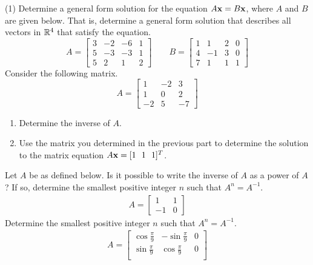 \begin{tasks}[resume, style=enumerate](1)
\task
  Determine a general form solution for the equation $A \mathbf x = B \mathbf x$,
  where $A$ and $B$ are given below.  That is, determine a general
  form solution that describes all vectors in $\mathbb R^4$ that satisfy the
  equation.
  \begin{displaymath}
    A =
    \begin{bmatrix}
      3 & -2 & -6 & 1 \\
      5 & -3 & -3 & 1 \\
      5 & 2 & 1 & 2
    \end{bmatrix}
    \qquad
    B =
    \begin{bmatrix}
      1 & 1 & 2 & 0 \\
      4 & -1 & 3 & 0 \\
      7 & 1 & 1 & 1
    \end{bmatrix}
  \end{displaymath}
\task
  Consider the following matrix.
  \begin{displaymath}
    A =
    \begin{bmatrix}
      1 & -2 & 3 \\
      1 & 0 & 2 \\
      -2 & 5 & -7
    \end{bmatrix}
  \end{displaymath}
  \begin{enumerate}[label=(\alph*)]
  \item
    Determine the inverse of $A$.
  \item
    Use the matrix you determined in the previous part to determine
    the solution to the matrix equation $A \mathbf x = [1 \ \ 1 \ \ 1]^T$.
  \end{enumerate}
\task
  Let $A$ be as defined below.  Is it possible to write the inverse of
  $A$ as a power of $A$?  If so, determine the smallest positive
  integer $n$ such that $A^n = A^{-1}$.
  \begin{align*}
    A = \begin{bmatrix} 1 & 1 \\ -1 & 0 \end{bmatrix}
  \end{align*}
\task Determine the smallest positive integer $n$ such that $A^n = A^{-1}$.
  \begin{align*}
    A =
    \begin{bmatrix}
      \cos\frac{\pi}{9} & -\sin\frac{\pi}{9} & 0 \\
      \sin\frac{\pi}{9} & \cos\frac{\pi}{9} & 0 \\

\end{bmatrix}
\end{align*}
\end{tasks}
